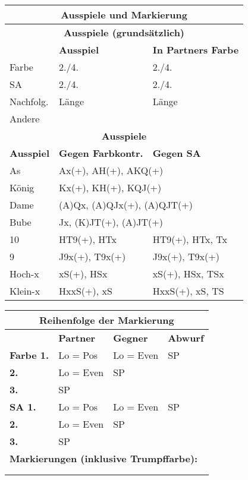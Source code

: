 \documentclass{article}
\begin{document}
\begin{multicols}{3}
\begin{tabularx}{\columnwidth}{|l|X|X|}
\hline \multicolumn{3}{|c|}{\bf \large Ausspiele und Markierung} \\

\hline \multicolumn{3}{|c|}{\bf Ausspiele (grundsätzlich)} \\
\hline           & {\bf Ausspiel} & {\bf In Partners Farbe} \\
\hline Farbe     & 2./4. & 2./4. \\
\hline SA        & 2./4. & 2./4. \\
\hline Nachfolg. & Länge & Länge \\
\hline Andere    & \multicolumn{2}{|l|}{} \\

\hline \multicolumn{3}{|c|}{\bf Ausspiele} \\
\hline {\bf Ausspiel} & {\bf Gegen Farbkontr.} & {\bf Gegen SA} \\
\hline As       & \multicolumn{2}{l|}{Ax(+), AH(+), AKQ(+)} \\
\hline König    & \multicolumn{2}{l|}{Kx(+), KH(+), KQJ(+) } \\
\hline Dame     & \multicolumn{2}{l|}{(A)Qx, (A)QJx(+), (A)QJT(+)} \\
\hline Bube     & \multicolumn{2}{l|}{Jx, (K)JT(+), (A)JT(+)} \\
\hline 10       & HT9(+), HTx & HT9(+), HTx, Tx \\
\hline 9        & J9x(+), T9x(+) & J9x(+), T9x(+) \\
\hline Hoch-x   & xS(+), HSx & xS(+), HSx, TSx \\
\hline Klein-x  & HxxS(+), xS & HxxS(+), xS, TS \\
\hline \end{tabularx}

\begin{tabularx}{\columnwidth}{|l|X|X|X|}
 \multicolumn{4}{|c|}{\bf Reihenfolge der Markierung} \\
\hline                & {\bf Partner} & {\bf Gegner} & {\bf Abwurf} \\
\hline \bf Farbe \hfill 1. & Lo = Pos  & Lo = Even & SP \\
\hline \bf       \hfill 2. & Lo = Even & SP        & \\
\hline \bf       \hfill 3. & SP        &           & \\
\hline \bf SA    \hfill 1. & Lo = Pos  & Lo = Even & SP \\
\hline \bf       \hfill 2. & Lo = Even & SP        & \\
\hline \bf       \hfill 3. & SP        &           & \\
\hline \multicolumn{4}{|l|}{\bf Markierungen (inklusive Trumpffarbe):} \\
       \multicolumn{4}{|l|}{} \\
       \multicolumn{4}{|l|}{} \\
\hline
\end{tabularx}


\end{multicols}
\end{document}
